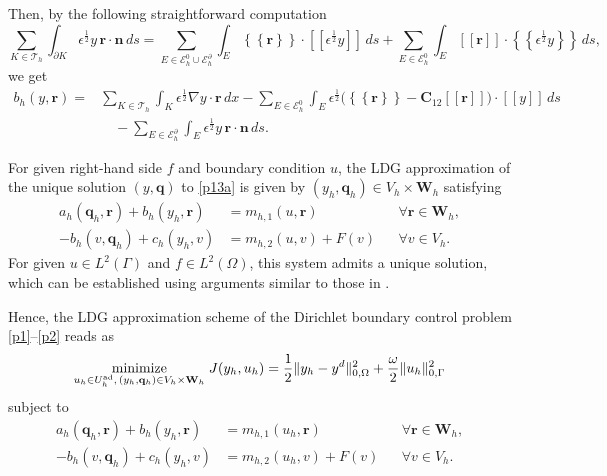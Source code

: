 \documentclass[a4paper,10pt]{article}
\newcommand {\average}[1] {\mbox{$\left\{\!\!\left\{ #1 \right\}\!\!\right\}$}}
\newcommand {\jump}[1] {\mbox{$\left[\!\left[ #1 \right]\!\right]$}}
\newcommand{\Uadh}{{U^{\textup{ad}}_h}}
\newcommand{\hF}{{\frac{1}{2}}}
\newcommand{\cT}{{\mathcal{T}}}
\newcommand{\cE}{{\mathcal{E}}}
\newcommand{\bq}{{\mathbf{q}}}
\newcommand{\br}{{\mathbf{r}}}
\newcommand{\bn}{{\mathbf{n}}}
\newcommand{\bW}{{\mathbf{W}}}
\numberwithin{theorem}{section}
\begin{document}
Then, by the following straightforward computation
\[
\sum\limits_{K \in \cT_h} \int_{\partial K} \epsilon^{\hF} y \, \br \cdot \bn \, ds 
= \sum\limits_{E \in \cE_h^0 \cup \cE_h^{\partial}} 
\int_E \average{\br} \cdot \jump{\epsilon^{\hF} y} \, ds 
+ \sum\limits_{E \in \cE_h^0} 
\int_E \jump{\br} \cdot \average{\epsilon^{\hF} y} \, ds,
\]
we get
\begin{align*}
b_h(y, \br) 
=&  \sum\limits_{K \in \cT_h} \int_{K} \epsilon^{\hF} \nabla y \cdot \br \, dx  
- \sum\limits_{E \in \cE_h^0} \int_E \epsilon^{\hF} 
\big( \average{\br} - \mathbf{C}_{12} \jump{\br} \big) 
\cdot \jump{y} \, ds \\
&\quad - \sum\limits_{E \in \cE_h^{\partial}} 
\int_E \epsilon^{\hF} y \, \br \cdot \bn \, ds.
\end{align*}

For given right-hand side $f$ and boundary condition $u$, the LDG approximation of the unique solution $(y,\bq)$ to \eqref{p13a} is given by $(y_h,\bq_h) \in V_h\times \bW_h$ satisfying
\begin{subequations}\label{LDG-approx}
\begin{align}
    a_h(\bq_h, \br) + b_h(y_h, \br) &= m_{h,1}(u, \br) 
    && \forall \br \in \bW_h, \\
   -b_h(v, \bq_h) + c_h(y_h, v) &= m_{h,2}(u, v) + F(v) 
    && \forall v \in V_h.
\end{align}
\end{subequations}
For given $u\in L^2(\Gamma)$ and $f\in L^2(\Omega)$, this system admits a unique solution, which can be established using arguments similar to those in \cite[Proposition 2.1]{PCastillo_BCockburn_IPergugia_DSchotzau_2000}.


Hence, the LDG approximation scheme of the Dirichlet boundary control problem 
\eqref{p1}--\eqref{p2} reads as 
\begin{equation}\label{DG6}
    \underset{u_h \in \Uadh, \, (y_h, \bq_h) \in V_h \times \bW_h}{\hbox{minimize}} \;
    J(y_h,u_h) = \frac{1}{2}\|y_h - y^d\|^{2}_{0,\Omega} 
    + \frac{\omega}{2} \|u_h\|^{2}_{0,\Gamma}
\end{equation}
subject to 
\begin{subequations}\label{DG5}
\begin{align}
    a_h(\bq_h, \br) + b_h(y_h, \br) &= m_{h,1}(u_h, \br) 
    && \forall \br \in \bW_h, \\
   -b_h(v, \bq_h) + c_h(y_h, v) &= m_{h,2}(u_h, v) + F(v) 
    && \forall v \in V_h.
\end{align}
\end{subequations}
\end{document}
